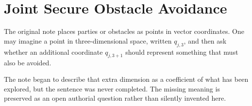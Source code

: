 \chapter{Joint Secure Obstacle Avoidance}
\label{chap:joint-obstacle-avoidance}


The original note places parties or obstacles as points in vector coordinates.
One may imagine a point in three-dimensional space, written \(q_{j,3}\), and
then ask whether an additional coordinate \(q_{j,3+1}\) should represent
something that must also be avoided.

The note began to describe that extra dimension as a coefficient of what has
been explored, but the sentence was never completed. The missing meaning is
preserved as an open authorial question rather than silently invented here.

